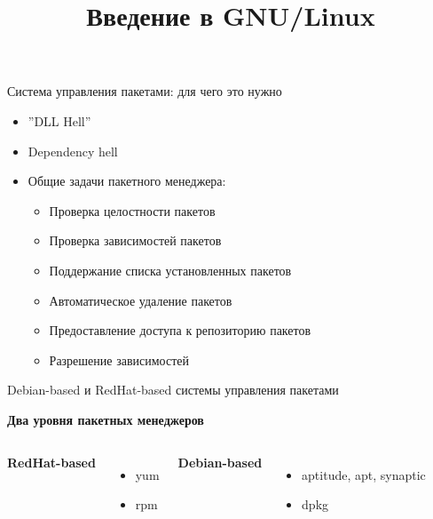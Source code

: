 
\title{Введение в GNU/Linux}









\frame{
	\tableofcontents
}

\begin{frame}{Система управления пакетами: для чего это нужно}
\begin{itemize}
 \item ''DLL Hell''
 \item Dependency hell
 \item Общие задачи пакетного менеджера:
   \begin{itemize}
     \item Проверка целостности пакетов
     \item Проверка зависимостей пакетов
        \item Поддержание списка установленных пакетов
        \item Автоматическое удаление пакетов
     \item Предоставление доступа к репозиторию пакетов
     \item Разрешение зависимостей
   \end{itemize}
\end{itemize}
\end{frame}

\begin{frame}{Debian-based и RedHat-based системы управления пакетами}
\begin{center}
 \textbf{Два уровня пакетных менеджеров}
\end{center}
\begin{columns}
  \begin{center}
    \textbf{RedHat-based}
  \end{center}
  \begin{itemize}
    \item yum
    \item rpm
  \end{itemize}
  \begin{center}
    \textbf{Debian-based}
  \end{center}
  \begin{itemize}
    \item aptitude, apt, synaptic
    \item dpkg
  \end{itemize}
\end{columns}
\end{frame}

